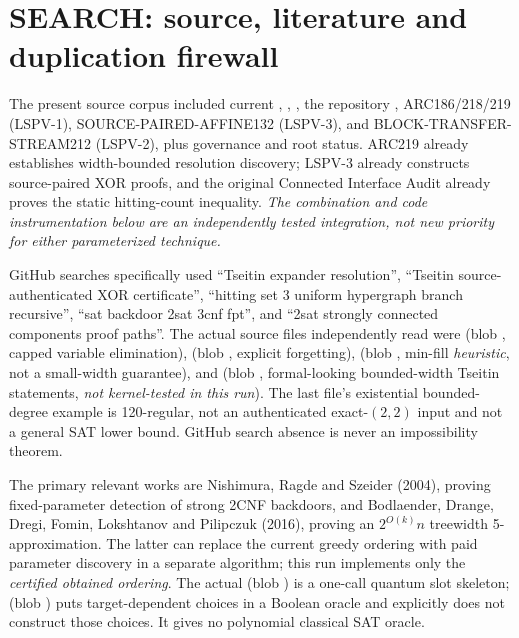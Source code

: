 \documentclass[11pt]{article}
\begin{document}
\section{SEARCH: source, literature and duplication firewall}
The present source corpus included current , , , the repository , ARC186/218/219 (LSPV-1), SOURCE-PAIRED-AFFINE132 (LSPV-3), and BLOCK-TRANSFER-STREAM212 (LSPV-2), plus governance and root status. ARC219 already establishes width-bounded resolution discovery; LSPV-3 already constructs source-paired XOR proofs, and the original Connected Interface Audit already proves the static hitting-count inequality. \emph{The combination and code instrumentation below are an independently tested integration, not new priority for either parameterized technique.}

GitHub searches specifically used ``Tseitin expander resolution'', ``Tseitin source-authenticated XOR certificate'', ``hitting set 3 uniform hypergraph branch recursive'', ``sat backdoor 2sat 3cnf fpt'', and ``2sat strongly connected components proof paths''. The actual source files independently read were  (blob , capped variable elimination),  (blob , explicit forgetting),  (blob , min-fill \emph{heuristic}, not a small-width guarantee), and  (blob , formal-looking bounded-width Tseitin statements, \emph{not kernel-tested in this run}). The last file's existential bounded-degree example is 120-regular, not an authenticated exact-$(2,2)$ input and not a general SAT lower bound. GitHub search absence is never an impossibility theorem.

The primary relevant works are Nishimura, Ragde and Szeider (2004), proving fixed-parameter detection of strong 2CNF backdoors, and Bodlaender, Drange, Dregi, Fomin, Lokshtanov and Pilipczuk (2016), proving an $2^{O(k)}n$ treewidth 5-approximation. The latter can replace the current greedy ordering with paid parameter discovery in a separate algorithm; this run implements only the \emph{certified obtained ordering}. The actual  (blob ) is a one-call quantum slot skeleton;  (blob ) puts target-dependent choices in a Boolean oracle and explicitly does not construct those choices. It gives no polynomial classical SAT oracle.
\end{document}
